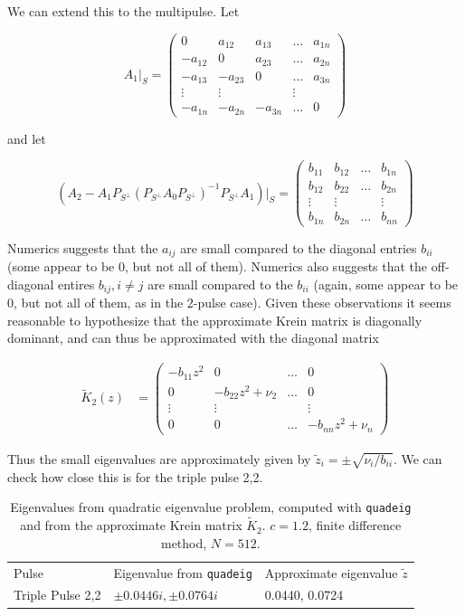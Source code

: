 \documentclass[12pt]{article}
\begin{document}
We can extend this to the multipulse. Let

\[
A_1|_S = \begin{pmatrix} 0 & a_{12} & a_{13} & \dots & a_{1n} \\ 
-a_{12} & 0 & a_{23} & \dots & a_{2n} \\
-a_{13} & -a_{23} & 0 & \dots & a_{3n} \\
\vdots & \vdots & & \vdots \\
-a_{1n} & -a_{2n} & -a_{3n} & \dots & 0
\end{pmatrix} 
\]

and let

\[
\left( A_2 - A_1 P_{S^\perp} (P_{S^\perp} A_0 P_{S^\perp})^{-1} P_{S^\perp} A_1 \right)|_S = 
\begin{pmatrix} b_{11} & b_{12} & \dots & b_{1n} \\ 
b_{12} & b_{22}  & \dots & b_{2n} \\
\vdots & \vdots & & \vdots \\
b_{1n} & b_{2n}  & \dots & b_{nn}
\end{pmatrix}
\]

Numerics suggests that the $a_{ij}$ are small compared to the diagonal entries $b_{ii}$ (some appear to be 0, but not all of them). Numerics also suggests that the off-diagonal entires $b_{ij}, i \neq j$ are small compared to the $b_{ii}$ (again, some appear to be 0, but not all of them, as in the 2-pulse case). Given these observations it seems reasonable to hypothesize that the approximate Krein matrix is diagonally dominant, and can thus be approximated with the diagonal matrix

\begin{align*}
\tilde{K}_2(z) &= \begin{pmatrix}
-b_{11} z^2 & 0 & \dots & 0\\
0 & -b_{22} z^2 + \nu_2 & \dots & 0 \\
\vdots & \vdots & & \vdots \\
0 & 0 & \dots & -b_{nn} z^2 + \nu_n
\end{pmatrix}
\end{align*}

Thus the small eigenvalues are approximately given by $\tilde{z}_i = \pm \sqrt{\nu_i / b_{ii}}$. We can check how close this is for the triple pulse 2,2.

\begin{table}[H]
\begin{tabular}{lll}
Pulse & Eigenvalue from \texttt{quadeig} & Approximate eigenvalue $\tilde{z}$ \\
Triple Pulse 2,2  & $\pm 0.0446i, \pm 0.0764i$ & 0.0440, 0.0724 \\
\end{tabular}
\caption{Eigenvalues from quadratic eigenvalue problem, computed with \texttt{quadeig} and from the approximate Krein matrix $\tilde{K}_2$. $c = 1.2$, finite difference method, $N = 512$. }
\end{table}
\end{document}
